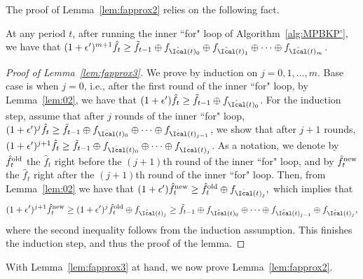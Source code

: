 The proof of Lemma~\ref{lem:fapprox2} relies on the following fact.
\begin{lemma}\label{lem:fapprox3}
	At any period $t$, after running the inner ``for" loop of Algorithm~\ref{alg:MPBKP'}, we have that $(1+\epsilon')^{m+1}\hat{f}_t\ge \tilde{f}_{t-1}\oplus f_{\hat{\Ical}(t)_0}\oplus f_{\hat{\Ical}(t)_1}\oplus\cdots \oplus f_{\hat{\Ical}(t)_m}$. 
\end{lemma}
\begin{proof}[Proof of Lemma~\ref{lem:fapprox3}]
	We prove by induction on $j=0,1,\ldots,m$. Base case is when $j=0$, i.e., after the first round of the inner ``for" loop, by Lemma~\ref{lem:02}, we have that $(1+\epsilon')\hat{f}_{t}\ge \tilde{f}_{t-1}\oplus  f_{\hat{\Ical}(t)_0}$. For the induction step, assume that after $j$ rounds of the inner ``for" loop, $(1+\epsilon')^j \hat{f}_{t}\ge \tilde{f}_{t-1}\oplus f_{\hat{\Ical}(t)_0}\oplus\cdots\oplus f_{\hat{\Ical}(t)_{j-1}}$, we show that after $j+1$ rounds, $(1+\epsilon')^{j+1} \hat{f}_{t}\ge \tilde{f}_{t-1}\oplus f_{\hat{\Ical}(t)_0}\oplus\cdots\oplus f_{\hat{\Ical}(t)_j}$. As a notation, we denote by $\hat{f}_t^{\rm old}$ the $\hat{f}_t$ right before the $(j+1)$th round of the inner ``for" loop, and by $\hat{f}_t^{\rm new}$ the $\hat{f}_t$ right after the $(j+1)$th round of the inner ``for" loop. Then, from Lemma~\ref{lem:02} we have that
	$
	(1+\epsilon')\hat{f}_t^{\rm new}\ge \hat{f}_t^{\rm old}\oplus f_{\hat{\Ical}(t)_j},
	$
	which implies that
	$$
	(1+\epsilon')^{j+1}\hat{f}_t^{\rm new}\ge (1+\epsilon')^j\hat{f}_t^{\rm old}\oplus f_{\hat{\Ical}(t)_j}\ge \tilde{f}_{t-1}\oplus f_{\hat{\Ical}(t)_0}\oplus\cdots\oplus f_{\hat{\Ical}(t)_{j-1}}\oplus f_{\hat{\Ical}(t)_j},
	$$
	where the second inequality follows from the induction assumption. This finishes the induction step, and thus the proof of the lemma.
\end{proof}

With Lemma~\ref{lem:fapprox3} at hand, we now prove Lemma~\ref{lem:fapprox2}.

